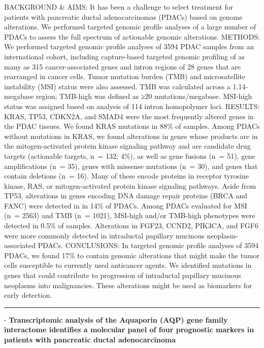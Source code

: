 \documentclass[]{article}
\begin{document}
BACKGROUND \& AIMS: It has been a challenge to select treatment for
patients with pancreatic ductal adenocarcinomas (PDACs) based on genome
alterations. We performed targeted genomic profile analyses of a large
number of PDACs to assess the full spectrum of actionable genomic
alterations. METHODS: We performed targeted genomic profile analyses of
3594 PDAC samples from an international cohort, including capture-based
targeted genomic profiling of as many as 315 cancer-associated genes and
intron regions of 28 genes that are rearranged in cancer cells. Tumor
mutation burden (TMB) and microsatellite instability (MSI) status were
also assessed. TMB was calculated across a 1.14-megabase region;
TMB-high was defined as ≥20 mutations/megabase. MSI-high status was
assigned based on analysis of 114 intron homopolymer loci. RESULTS:
KRAS, TP53, CDKN2A, and SMAD4 were the most frequently altered genes in
the PDAC tissues. We found KRAS mutations in 88\% of samples. Among
PDACs without mutations in KRAS, we found alterations in genes whose
products are in the mitogen-activated protein kinase signaling pathway
and are candidate drug targets (actionable targets, n~= 132; 4\%), as
well as gene fusions (n~= 51), gene amplifications (n~= 35), genes with
missense mutations (n~= 30), and genes that contain deletions (n~= 16).
Many of these encode proteins in receptor tyrosine kinase, RAS, or
mitogen-activated protein kinase signaling pathways. Aside from TP53,
alterations in genes encoding DNA damage repair proteins (BRCA and FANC)
were detected in in 14\% of PDACs. Among PDACs evaluated for MSI (n~=
2563) and TMB (n~= 1021), MSI-high and/or TMB-high phenotypes were
detected in 0.5\% of samples. Alterations in FGF23, CCND2, PIK3CA, and
FGF6 were more commonly detected in intraductal papillary mucinous
neoplasm-associated PDACs. CONCLUSIONS: In targeted genomic profile
analyses of 3594 PDACs, we found 17\% to contain genomic alterations
that might make the tumor cells susceptible to currently used anticancer
agents. We identified mutations in genes that could contribute to
progression of intraductal papillary mucinous neoplasms into
malignancies. These alterations might be used as biomarkers for early
detection.

{}

{}

\begin{center}\rule{0.5\linewidth}{\linethickness}\end{center}

 - \textbf{Transcriptomic analysis of the Aquaporin (AQP) gene family
interactome identifies a molecular panel of four prognostic markers in
patients with pancreatic ductal adenocarcinoma}
\end{document}

